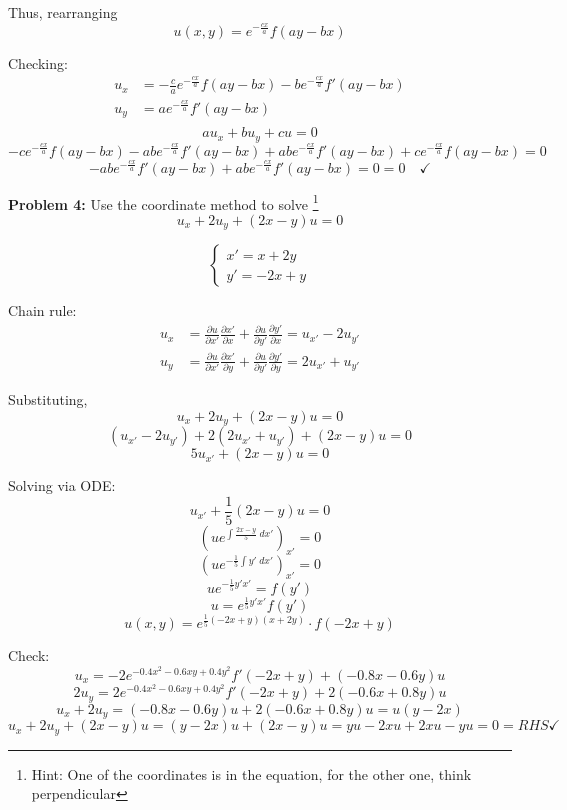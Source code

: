 \documentclass[12pt]{article}
\newcommand{\ans}[1]{\boxed{\text{#1}}}
\begin{document}
    Thus, rearranging 
    \[\ans{$u(x,y) = e^{-\frac{cx}{a}}f(ay - bx)$}\]
    
    Checking:
    \begin{align*}
        u_x &= -\frac{c}{a}e^{-\frac{cx}{a}}f(ay - bx) - be^{-\frac{cx}{a}}f'(ay - bx)\\
        u_y &= ae^{-\frac{cx}{a}}f'(ay - bx)\\
    \end{align*}
    \[au_x + bu_y + cu = 0\]
    \[-ce^{-\frac{cx}{a}}f(ay - bx) - abe^{-\frac{cx}{a}}f'(ay - bx) + abe^{-\frac{cx}{a}}f'(ay - bx) + ce^{-\frac{cx}{a}}f(ay - bx) = 0\]
    \[-abe^{-\frac{cx}{a}}f'(ay - bx) + abe^{-\frac{cx}{a}}f'(ay - bx) = 0 = 0 \quad \checkmark\]

\color{black}

\pagebreak 
\textbf{Problem 4:} Use the coordinate method to solve \footnote{
    Hint: One of the coordinates is in the equation, for the other one, think perpendicular
}
\[u_x + 2u_y + (2x-y)u = 0\]

\color{blue}
\[\begin{cases}
    x' = x + 2y\\
    y' = -2x + y
\end{cases}\]

Chain rule:
\begin{align*}
    u_x &= \frac{\partial u}{\partial x'}\frac{\partial x'}{\partial x} + \frac{\partial u}{\partial y'}\frac{\partial y'}{\partial x} = u_{x'} - 2u_{y'}\\
    u_y &= \frac{\partial u}{\partial x'}\frac{\partial x'}{\partial y} + \frac{\partial u}{\partial y'}\frac{\partial y'}{\partial y} = 2u_{x'} + u_{y'}
\end{align*}

Substituting,
\[u_x + 2u_y + (2x-y)u = 0\]
\[(u_{x'} - 2u_{y'}) + 2(2u_{x'} + u_{y'}) + (2x-y)u = 0\]
\[5u_{x'} + (2x-y)u = 0\]

Solving via ODE:
\[u_{x'} + \frac{1}{5}(2x-y)u = 0\]
\[(ue^{\int \frac{2x - y}{5} \; dx'})_{x'} = 0\]
\[(ue^{-\frac{1}{5}\int y' \; dx'})_{x'} = 0\]
\[ue^{-\frac{1}{5}y'x'} = f(y')\]
\[u = e^{\frac{1}{5}y'x'}f(y')\]
\[\ans{$u(x, y) = e^{\frac{1}{5}(-2x+y)(x+2y)}\cdot f(-2x+y)$}\]

Check:
\[u_x = -2e^{-0.4x^2 - 0.6xy + 0.4y^2}f'(-2x+y) + (-0.8x - 0.6y)u\]
\[2u_y = 2e^{-0.4x^2 - 0.6xy + 0.4y^2}f'(-2x+y)+ 2(-0.6x + 0.8y)u\]
\[u_x + 2u_y = (-0.8x-0.6y)u + 2(-0.6x + 0.8y)u = u(y-2x)\]
\[u_x + 2u_y + (2x- y)u = (y-2x)u + (2x- y)u = yu - 2xu + 2xu - yu = 0 = RHS \checkmark\]
\color{black}
\end{document}
